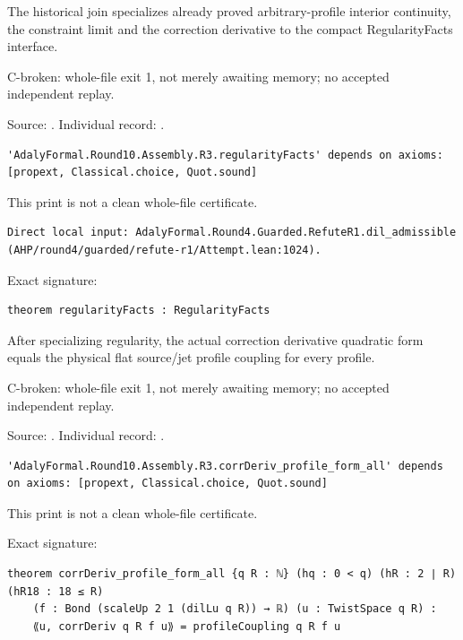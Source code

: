 \begin{theorem}
\label{join-3}
The historical join specializes already proved arbitrary-profile interior continuity, the constraint limit and the correction derivative to the compact RegularityFacts interface.
\par C-broken: whole-file exit 1, not merely awaiting memory; no accepted independent replay.
\par Source: \texttt{}. Individual record: \texttt{}.
\begin{verbatim}
'AdalyFormal.Round10.Assembly.R3.regularityFacts' depends on axioms: [propext, Classical.choice, Quot.sound]
\end{verbatim}
This print is not a clean whole-file certificate.
\begin{verbatim}
Direct local input: AdalyFormal.Round4.Guarded.RefuteR1.dil_admissible (AHP/round4/guarded/refute-r1/Attempt.lean:1024).
\end{verbatim}
\par Exact signature:
\begin{verbatim}
theorem regularityFacts : RegularityFacts
\end{verbatim}
\end{theorem}

\begin{theorem}
\label{join-4}
After specializing regularity, the actual correction derivative quadratic form equals the physical flat source/jet profile coupling for every profile.
\par C-broken: whole-file exit 1, not merely awaiting memory; no accepted independent replay.
\par Source: \texttt{}. Individual record: \texttt{}.
\begin{verbatim}
'AdalyFormal.Round10.Assembly.R3.corrDeriv_profile_form_all' depends on axioms: [propext, Classical.choice, Quot.sound]
\end{verbatim}
This print is not a clean whole-file certificate.
\par Exact signature:
\begin{verbatim}
theorem corrDeriv_profile_form_all {q R : ℕ} (hq : 0 < q) (hR : 2 ∣ R) (hR18 : 18 ≤ R)
    (f : Bond (scaleUp 2 1 (dilLu q R)) → ℝ) (u : TwistSpace q R) :
    ⟪u, corrDeriv q R f u⟫ = profileCoupling q R f u
\end{verbatim}
\end{theorem}

